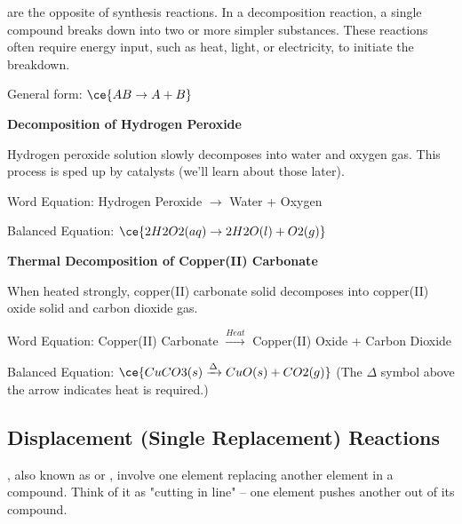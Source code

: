 {

 are the opposite of synthesis reactions. In a decomposition reaction, a single compound breaks down into two or more simpler substances.  These reactions often require energy input, such as heat, light, or electricity, to initiate the breakdown.

General form: $\ce{AB \rightarrow A + B}$

\begin{example}
\textbf{Decomposition of Hydrogen Peroxide}

Hydrogen peroxide solution slowly decomposes into water and oxygen gas. This process is sped up by catalysts (we'll learn about those later).

Word Equation: Hydrogen Peroxide $\rightarrow$ Water + Oxygen

Balanced Equation: $\ce{2H2O2(aq) \rightarrow 2H2O(l) + O2(g)}$
\end{example}

\begin{example}
\textbf{Thermal Decomposition of Copper(II) Carbonate}

When heated strongly, copper(II) carbonate solid decomposes into copper(II) oxide solid and carbon dioxide gas.

Word Equation: Copper(II) Carbonate $\xrightarrow{Heat}$ Copper(II) Oxide + Carbon Dioxide

Balanced Equation: $\ce{CuCO3(s) \xrightarrow{\Delta} CuO(s) + CO2(g)}$ (The $\Delta$ symbol above the arrow indicates heat is required.)
\end{example}

\subsection{Displacement (Single Replacement) Reactions}


, also known as  or , involve one element replacing another element in a compound.  Think of it as "cutting in line" – one element pushes another out of its compound.

}
